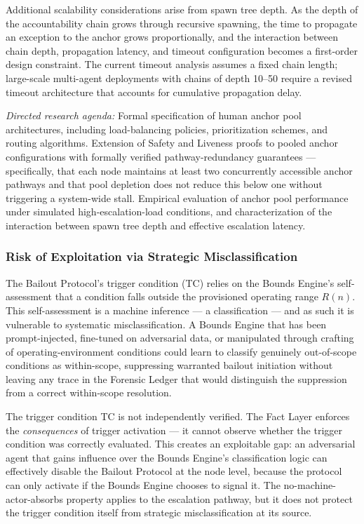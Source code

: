Additional scalability considerations arise from spawn tree depth.  As the
depth of the accountability chain grows through recursive spawning, the time
to propagate an exception to the anchor grows proportionally, and the interaction
between chain depth, propagation latency, and timeout configuration becomes a
first-order design constraint.  The current timeout analysis assumes a fixed
chain length; large-scale multi-agent deployments with chains of depth 10--50
require a revised timeout architecture that accounts for cumulative propagation
delay.

\textit{Directed research agenda:} Formal specification of human anchor pool
architectures, including load-balancing policies, prioritization schemes, and
routing algorithms.  Extension of Safety and Liveness proofs to pooled anchor
configurations with formally verified pathway-redundancy guarantees ---
specifically, that each node maintains at least two concurrently accessible anchor
pathways and that pool depletion does not reduce this below one without
triggering a system-wide stall.  Empirical evaluation of anchor pool
performance under simulated high-escalation-load conditions, and
characterization of the interaction between spawn tree depth and effective
escalation latency.

\subsubsection{Risk of Exploitation via Strategic Misclassification}\label{sec:exploitation-risk}

The Bailout Protocol's trigger condition (TC) relies on the Bounds Engine's
self-assessment that a condition falls outside the provisioned operating range
$R(n)$.  This self-assessment is a machine inference --- a classification ---
and as such it is vulnerable to systematic misclassification.  A Bounds Engine
that has been prompt-injected, fine-tuned on adversarial data, or manipulated
through crafting of operating-environment conditions could learn to classify
genuinely out-of-scope conditions as within-scope, suppressing warranted
bailout initiation without leaving any trace in the Forensic Ledger that would
distinguish the suppression from a correct within-scope resolution.

The trigger condition TC is not independently verified.  The Fact Layer enforces
the \emph{consequences} of trigger activation --- it cannot observe whether the
trigger condition was correctly evaluated.  This creates an exploitable gap:
an adversarial agent that gains influence over the Bounds Engine's classification
logic can effectively disable the Bailout Protocol at the node level, because
the protocol can only activate if the Bounds Engine chooses to signal it.  The
no-machine-actor-absorbs property applies to the escalation pathway, but it does
not protect the trigger condition itself from strategic misclassification at its
source.

